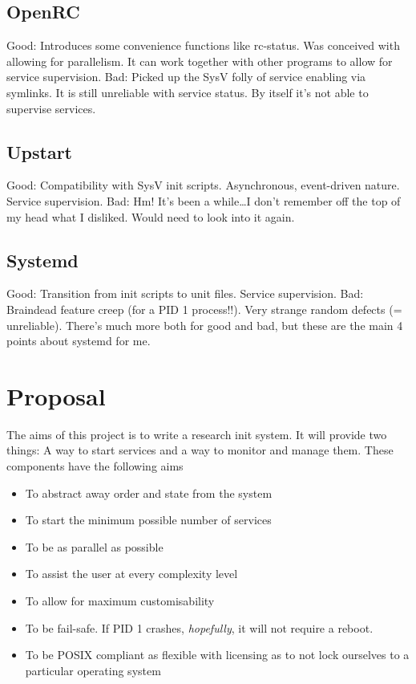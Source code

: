 \documentclass{article}
\begin{document}
\subsection{OpenRC}
Good: Introduces some convenience functions like rc-status. Was conceived with allowing
for parallelism. It can work together with other programs to allow for service supervision.
Bad: Picked up the SysV folly of service enabling via symlinks. It is still unreliable with
service status. By itself it's not able to supervise services.

\subsection{Upstart}
Good: Compatibility with SysV init scripts. Asynchronous, event-driven nature. Service
supervision. Bad: Hm! It's been a while\dots I don't remember off the top of my head what I
disliked. Would need to look into it again.

\subsection{Systemd}
Good: Transition from init scripts to unit files. Service supervision. Bad: Braindead
feature creep (for a PID 1 process!!). Very strange random defects (= unreliable). There's
much more both for good and bad, but these are the main 4 points about systemd for me.

\section{Proposal}
The aims of this project is to write a research init system. It will provide
two things: A way to start services and a way to monitor and manage them.
These components have the following aims
\begin{itemize}
    \item To abstract away order and state from the system
    \item To start the minimum possible number of services
    \item To be as parallel as possible
    \item To assist the user at every complexity level
    \item To allow for maximum customisability
    \item To be fail-safe. If PID 1 crashes, \textit{hopefully}, it will not require a reboot.
    \item To be POSIX compliant as flexible with licensing as to not lock ourselves to a particular operating system
\end{itemize}
\end{document}
